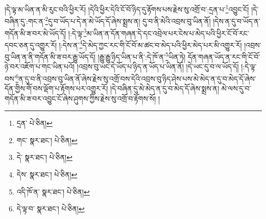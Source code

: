 །དེ་ལྟ་མ་ཡིན་ན་མི་རུང་བའི་ཕྱིར་རོ། །དེའི་ཕྱིར་དེའི་ངོ་བོ་ཉིད་དུ་རྟོགས་པས་རྗེས་སུ་འགྲོ་བ་:དྲན་པ་\footnote{དྲན་  པེ་ཅིན། }འབྱུང་ངོ། །དེ་བཞིན་དུ་:གང་ན་\footnote{གང་  སྣར་ཐང་།  པེ་ཅིན། }དུ་བ་ཡོད་པ་དེ་ན་མེ་ཡོད་དོ་ཞེས་སྨྲས་ན། དུ་བ་ནི་མེའི་འབྲས་བུ་ཡིན་ནོ། །དེས་ན་དུ་བ་ཡོད་ན་གདོན་མི་ཟ་བར་མེ་ཡོད་དོ། །:དེ་ལྟ་\footnote{དེ་  སྣར་ཐང་།  པེ་ཅིན། }མ་ཡིན་ན་དོན་གཞན་དེ་དང་འབྲེལ་པར་ངེས་པ་མེད་པའི་ཕྱིར་ངོ་བོ་རང་དབང་ཅན་དུ་འགྱུར་རོ། །:དེས་ན་\footnote{དེས་  སྣར་ཐང་།  པེ་ཅིན། }དེ་མེད་ཀྱང་རང་གི་ངོ་བོ་མ་ཚང་བ་མེད་པའི་ཕྱིར་མེད་པར་མི་འགྱུར་རོ། །འབྲས་བུ་ཡིན་ན་ནི་གདོན་མི་ཟ་བར་རྒྱུ་ཡོད་དོ། །རྒྱུ་རྒྱུ་ཉིད་ཡིན་པ་ནི་:དེ་ཁོ་ན་\footnote{འདི་ཁོ་ན་  སྣར་ཐང་།  པེ་ཅིན། }ཡིན་ཏེ། དོན་གཞན་ཡོད་ན་རང་གི་ངོ་བོ་ཉེ་བར་འཇོག་པ་གང་ཡིན་པའོ། །འབྲས་བུ་ཡང་དེ་ཡོད་པ་ཉིད་ན་ཡོད་པ་ཡིན་ནོ། །དེ་ཡང་དུ་བ་ལ་ཡོད་དོ། །:དེ་ལྟ་བས་\footnote{དེ་ལྟ་བ་  སྣར་ཐང་།  པེ་ཅིན། }ན་དུ་བ་ནི་འབྲས་བུ་ཡིན་ནོ་ཞེས་རྗེས་སུ་འགྲོ་བས་དེའི་འབྲས་བུ་ཉིད་ཤེས་པས་མེ་མེད་ན་དུ་བ་མེད་དོ་ཞེས་དོན་གྱིས་གོ་བས་ལྡོག་པ་རྟོགས་པར་འགྱུར་རོ། །དེ་བཞིན་དུ་མེ་མེད་ན་དུ་བ་མེད་དོ་ཞེས་སྨྲས་ན། མེ་ལས་དུ་བ་གདོན་མི་ཟ་བར་འབྱུང་ངོ་ཞེས་ཤུགས་ཀྱིས་རྗེས་སུ་འགྲོ་བ་རྟོགས་སོ། །
